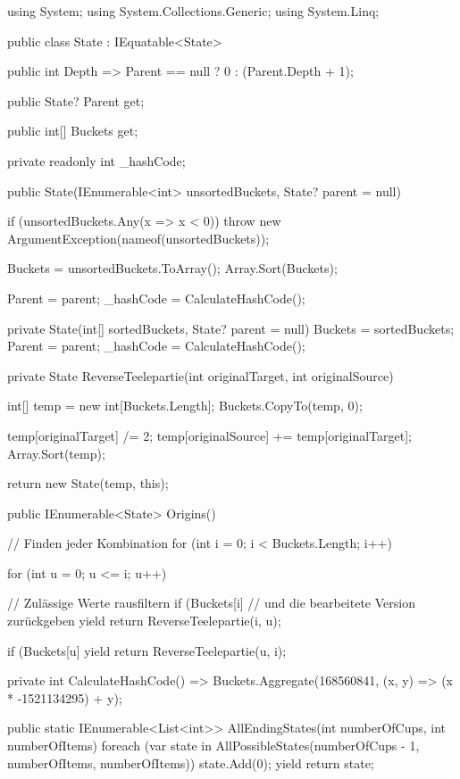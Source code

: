 \documentclass[a4paper,10pt,ngerman]{scrartcl}
\begin{document}
\begin{lstcs}
using System;
using System.Collections.Generic;
using System.Linq;

public class State : IEquatable<State>
{
    public int Depth => Parent == null ? 0 : (Parent.Depth + 1);
    
    public State? Parent { get; }
    
    public int[] Buckets { get; }
    
    private readonly int _hashCode;
    
    public State(IEnumerable<int> unsortedBuckets, State? parent = null)
    {
        if (unsortedBuckets.Any(x => x < 0)) throw new ArgumentException(nameof(unsortedBuckets));
    
        Buckets = unsortedBuckets.ToArray();
        Array.Sort(Buckets);
    
        Parent = parent;
        _hashCode = CalculateHashCode();
    }
    
    private State(int[] sortedBuckets, State? parent = null)
    {
        Buckets = sortedBuckets;
        Parent = parent;
        _hashCode = CalculateHashCode();
    }
    
    private State ReverseTeelepartie(int originalTarget, int originalSource)
    {
        int[] temp = new int[Buckets.Length];
        Buckets.CopyTo(temp, 0);
    
        temp[originalTarget] /= 2;
        temp[originalSource] += temp[originalTarget];
        Array.Sort(temp);
    
        return new State(temp, this);
    }
    
    public IEnumerable<State> Origins()
    {
        // Finden jeder Kombination
        for (int i = 0; i < Buckets.Length; i++)
        {
            for (int u = 0; u <= i; u++)
            {
                // Zulässige Werte rausfiltern
                if (Buckets[i] %
                {
                    // und die bearbeitete Version zurückgeben
                    yield return ReverseTeelepartie(i, u);
                }
    
                if (Buckets[u] %
                {
                    yield return ReverseTeelepartie(u, i);
                }
            }
        }
    }
    
    private int CalculateHashCode() =>
        Buckets.Aggregate(168560841, (x, y) => (x * -1521134295) + y);
    
    public static IEnumerable<List<int>> AllEndingStates(int numberOfCups, int numberOfItems)
    {
        foreach (var state in AllPossibleStates(numberOfCups - 1, numberOfItems, numberOfItems))
        {
            state.Add(0);
            yield return state;
        }
    }
    
}
\end{lstcs}
\end{document}

